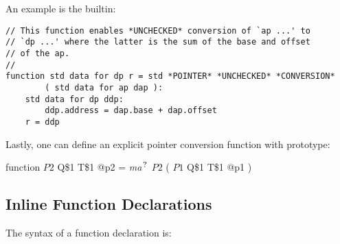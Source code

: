 \documentclass[12pt]{article}
\newcommand{\QMARK}{{$^{\,\mbox{\footnotesize ?}}$}}
\newenvironment{indpar}[1][0.3in]%
	{\begin{list}{}%
		     {\setlength{\itemsep}{0in}%
		      \setlength{\topsep}{0in}%
		      \setlength{\parsep}{1ex}%
		      \setlength{\labelwidth}{#1}%
		      \setlength{\leftmargin}{#1}%
		      \addtolength{\leftmargin}{\labelsep}}%
	 \item}%
	{\end{list}}
\begin{document}
An example is the builtin:
\begin{indpar}\begin{verbatim}
// This function enables *UNCHECKED* conversion of `ap ...' to
// `dp ...' where the latter is the sum of the base and offset
// of the ap.
//
function std data for dp r = std *POINTER* *UNCHECKED* *CONVERSION*
        ( std data for ap dap ):
    std data for dp ddp:
        ddp.address = dap.base + dap.offset
    r = ddp
\end{verbatim}\end{indpar}

Lastly, one can define an explicit pointer conversion function with
prototype:
\begin{indpar}
function $P2$ Q\$1 T\$1 @p2 = {\em ma}\QMARK{} $P2$ ( $P1$ Q\$1 T\$1 @p1 )
\end{indpar}

\subsection{Inline Function Declarations}
\label{INLINE-FUNCTION-DECLARATIONS}

The syntax of a function declaration is:
\end{document}
